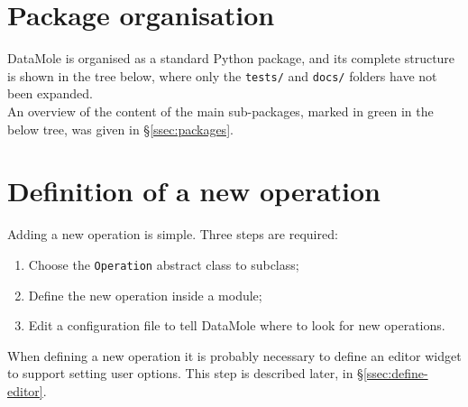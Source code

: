 \section{Package organisation}\label{sec:dirtree}
DataMole is organised as a standard Python package, and its complete structure is shown in the tree below, where only the \texttt{tests/} and \texttt{docs/} folders have not been expanded.\\
An overview of the content of the main sub-packages, marked in green in the below tree, was given in §\ref{ssec:packages}.
\clearpage


\section{Definition of a new operation}\label{sec:ext-operations}
Adding a new operation is simple. Three steps are required:
\begin{enumerate}
	\item Choose the \texttt{Operation} abstract class to subclass;
	\item Define the new operation inside a module;
	\item Edit a configuration file to tell DataMole where to look for new operations.
\end{enumerate}
When defining a new operation it is probably necessary to define an editor widget to support setting user options. This step is described later, in §\ref{ssec:define-editor}.

